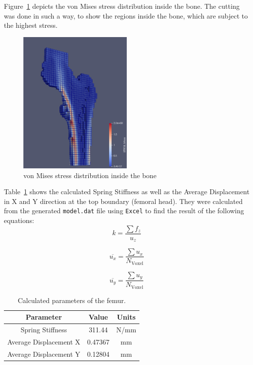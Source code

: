 \documentclass[a4paper,12pt]{article}
\begin{document}
    \vspace{10pt}
    Figure~\ref{fig:stress} depicts the von Mises stress distribution inside the bone.
    The cutting was done in such a way, to show the regions inside the bone, which are subject to the highest stress.

    \begin{figure}[htbp]
        \centering
        \includegraphics[width=0.5\textwidth]{stress_mises}
        \caption{von Mises stress distribution inside the bone}
        \label{fig:stress}
    \end{figure}

    \vspace{10pt}
    Table~\ref{tab:calculated_parameters} shows the calculated Spring Stiffness as well as the Average Displacement in X and Y direction at the top boundary (femoral head).
    They were calculated from the generated \texttt{model.dat} file using \texttt{Excel} to find the result of the following equations:
    \begin{equation}
        k = \frac{\sum f_z}{u_z}
    \end{equation}

    \begin{equation}
        \overline{u_x} = \frac{\sum u_x}{N_{\text{Voxel}}}
    \end{equation}

    \begin{equation}
        \overline{u_y} = \frac{\sum u_y}{N_{\text{Voxel}}}
    \end{equation}

    \begin{table}[h]
        \centering
        \begin{tabular}{|c|c|c|}
            \hline
            Parameter              & Value   & Units \\
            \hline
            Spring Stiffness       & 311.44  & N/mm  \\
            Average Displacement X & 0.47367 & mm    \\
            Average Displacement Y & 0.12804 & mm    \\
            \hline
        \end{tabular}
        \caption{Calculated parameters of the femur.}
        \label{tab:calculated_parameters}
    \end{table}
\end{document}
